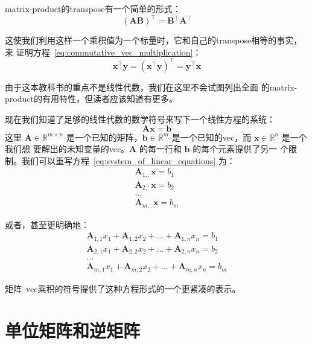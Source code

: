 \gls*{matrix-product}的\gls*{transpose}有一个简单的形式：
\begin{equation}
  (\pmb{A}\pmb{B})^{\top} = \pmb{B}^{\top}\pmb{A}^{\top}
  \label{eq:transpose_of_matrix_product}
\end{equation}

这使我们利用这样一个乘积值为一个标量时，它和自己的\gls*{transpose}相等的事实，来
证明方程~\ref{eq:commutative_vec_multiplication}：
\begin{equation}
  \pmb{x}^{\top}\pmb{y} = (\pmb{x}^{\top}\pmb{y})^{\top} = \pmb{y}^{\top}\pmb{x}
  \label{eq:demonstrate_commutative_vec_multiplication}
\end{equation}

由于这本教科书的重点不是线性代数，我们在这里不会试图列出全面
的\gls*{matrix-product}的有用特性，但读者应该知道有更多。

现在我们知道了足够的线性代数的数学符号来写下一个线性方程的系统：
\begin{equation}
  \pmb{A}\pmb{x} = \pmb{b}
  \label{eq:system_of_linear_equations}
\end{equation}
这里 $\pmb{A} \in \mathbb{R}^{m \times n}$ 是一个已知的矩阵，$\pmb{b} \in
\mathbb{R}^m$ 是一个已知的\gls*{vec}，而 $\pmb{x} \in \mathbb{R}^n$ 是一个我们想
要解出的未知变量的\gls*{vec}。$\pmb{A}$ 的每一行和 $\pmb{b}$ 的每个元素提供了另一
个限制。我们可以重写方程~\ref{eq:system_of_linear_equations} 为：
\begin{gather}
  \pmb{A}_{1,:}\pmb{x} = b_1\\
  \pmb{A}_{2,:}\pmb{x} = b_2\\
  \ldots \\
  \pmb{A}_{m,:}\pmb{x} = b_m
\end{gather}

或者，甚至更明确地：
\begin{gather}
  \pmb{A}_{1,1}x_1 + \pmb{A}_{1,2}x_2 + \ldots + \pmb{A}_{1,n}x_n = b_1\\
  \pmb{A}_{2,1}x_1 + \pmb{A}_{2,2}x_2 + \ldots + \pmb{A}_{2,n}x_n = b_2\\
  \ldots\\
  \pmb{A}_{m,1}x_1 + \pmb{A}_{m,2}x_2 + \ldots + \pmb{A}_{m,n}x_n = b_m
\end{gather}

矩阵--\gls*{vec}乘积的符号提供了这种方程形式的一个更紧凑的表示。

\section{单位矩阵和逆矩阵}
\label{sec:identity_and_inverse_matrices}

